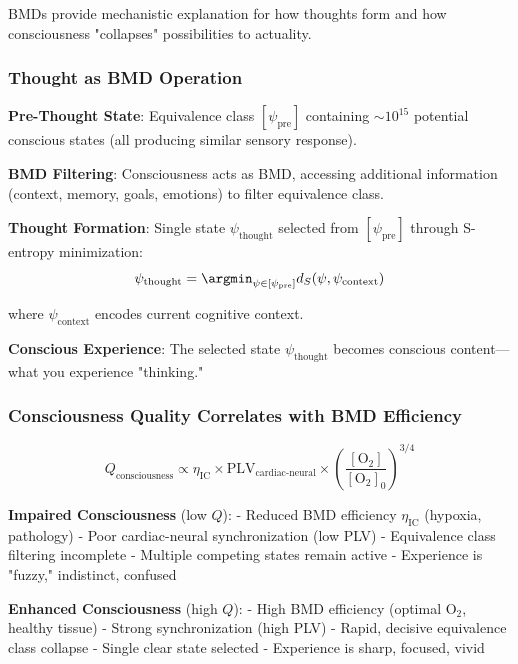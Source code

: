 \documentclass[11pt,onecolumn]{article}
\begin{document}
BMDs provide mechanistic explanation for how thoughts form and how consciousness "collapses" possibilities to actuality.

\subsubsection{Thought as BMD Operation}

\textbf{Pre-Thought State}: Equivalence class $[\psi_{\text{pre}}]$ containing $\sim 10^{15}$ potential conscious states (all producing similar sensory response).

\textbf{BMD Filtering}: Consciousness acts as BMD, accessing additional information (context, memory, goals, emotions) to filter equivalence class.

\textbf{Thought Formation}: Single state $\psi_{\text{thought}}$ selected from $[\psi_{\text{pre}}]$ through S-entropy minimization:
\begin{equation}
\psi_{\text{thought}} = \argmin_{\psi \in [\psi_{\text{pre}}]} d_S(\psi, \psi_{\text{context}})
\end{equation}

where $\psi_{\text{context}}$ encodes current cognitive context.

\textbf{Conscious Experience}: The selected state $\psi_{\text{thought}}$ becomes conscious content---what you experience "thinking."

\subsubsection{Consciousness Quality Correlates with BMD Efficiency}

\begin{equation}
Q_{\text{consciousness}} \propto \eta_{\text{IC}} \times \text{PLV}_{\text{cardiac-neural}} \times \left(\frac{[\text{O}_2]}{[\text{O}_2]_0}\right)^{3/4}
\end{equation}

\textbf{Impaired Consciousness} (low $Q$):
- Reduced BMD efficiency $\eta_{\text{IC}}$ (hypoxia, pathology)
- Poor cardiac-neural synchronization (low PLV)
- Equivalence class filtering incomplete
- Multiple competing states remain active
- Experience is "fuzzy," indistinct, confused

\textbf{Enhanced Consciousness} (high $Q$):
- High BMD efficiency (optimal O$_2$, healthy tissue)
- Strong synchronization (high PLV)
- Rapid, decisive equivalence class collapse
- Single clear state selected
- Experience is sharp, focused, vivid
\end{document}
